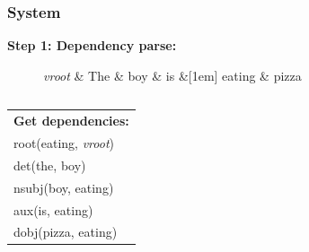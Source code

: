 \documentclass[xcolor={dvipsnames}]{beamer}
\begin{document}
\begin{frame}
\frametitle{System}

\textbf{Step 1: Dependency parse:}

\begin{figure}[htb!]
\begin{center}
    \begin{dependency}[arc edge,text only label,label style={above}]
    \begin{deptext}[column sep=.5em]
      \textit{vroot} \& The \& boy \& is \&[1em] eating \& pizza \\
    \end{deptext}
  \end{dependency}
\end{center}
\label{fig:prep-dependency}
\end{figure}

\begin{columns}
\pause
{}

\begin{table}
\begin{tabular}{l}
\textbf{Get dependencies:} \\
root(eating, \textit{vroot}) \\
det(the, boy) \\
nsubj(boy, eating) \\
aux(is, eating) \\
dobj(pizza, eating) \\
\end{tabular}
\end{table}



\end{columns}
\end{frame}
\end{document}
